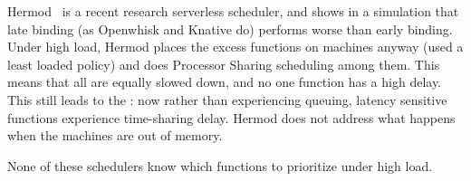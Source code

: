 Hermod~\cite{hermod} is a recent research serverless scheduler, and shows in a
simulation that late binding (as Openwhisk and Knative do) performs worse than
early binding. Under high load, Hermod places the excess functions on machines
anyway (used a least loaded policy) and does Processor Sharing scheduling among
them. This means that all are equally slowed down, and no one function has a
high delay. This still leads to the \problem{}: now rather than experiencing
queuing, latency sensitive functions experience time-sharing delay. Hermod does not
address what happens when the machines are out of memory. 


None of these schedulers 
know which functions to prioritize under high load.




